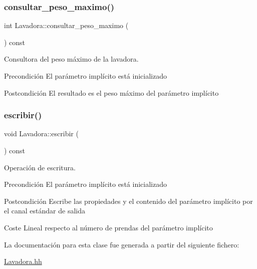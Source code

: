 \subsubsection{\texorpdfstring{consultar\+\_\+peso\+\_\+maximo()}{consultar\_peso\_maximo()}}
{\footnotesize\ttfamily int Lavadora\+::consultar\+\_\+peso\+\_\+maximo (\begin{DoxyParamCaption}{ }\end{DoxyParamCaption}) const}



Consultora del peso máximo de la lavadora. 

\begin{DoxyPrecond}{Precondición}
El parámetro implícito está inicializado 
\end{DoxyPrecond}
\begin{DoxyPostcond}{Postcondición}
El resultado es el peso máximo del parámetro implícito 
\end{DoxyPostcond}
\mbox{\label{class_lavadora_a2372c33a5f76dda6e3892d118ae726f1}} 
\subsubsection{\texorpdfstring{escribir()}{escribir()}}
{\footnotesize\ttfamily void Lavadora\+::escribir (\begin{DoxyParamCaption}{ }\end{DoxyParamCaption}) const}



Operación de escritura. 

\begin{DoxyPrecond}{Precondición}
El parámetro implícito está inicializado 
\end{DoxyPrecond}
\begin{DoxyPostcond}{Postcondición}
Escribe las propiedades y el contenido del parámetro implícito por el canal estándar de salida 
\end{DoxyPostcond}
\begin{DoxyParagraph}{Coste}
Lineal respecto al número de prendas del parámetro implícito 
\end{DoxyParagraph}


La documentación para esta clase fue generada a partir del siguiente fichero\+:\begin{DoxyCompactItemize}
\item 
\hyperlink{_lavadora_8hh}{Lavadora.\+hh}\end{DoxyCompactItemize}
